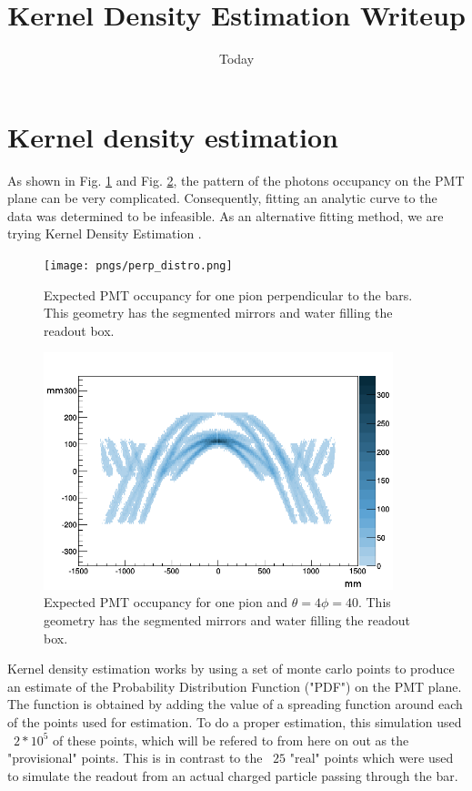 \documentclass[11pt]{article}
\begin{document}
\title{Kernel Density Estimation Writeup}
\date{Today}
\maketitle

\section{Kernel density estimation}
As shown in Fig. \ref{fig:perp_distribution} and Fig. \ref{fig:distribution}, the pattern of the photons occupancy on the PMT plane can be very complicated.  Consequently, fitting an analytic curve to the data was determined to be infeasible.  As an alternative fitting method, we are trying Kernel Density Estimation \cite{rosenblatt1956}.
\begin{figure}
\centering
\texttt{[image: pngs/perp\_distro.png]}
\caption{Expected PMT occupancy for one pion perpendicular to the bars.  This geometry has the segmented mirrors and water filling the readout box.\label{fig:perp_distribution}}
\end{figure}
\begin{figure}
\centering
\includegraphics[width=4in]{pngs/fitdirc_ang440_3seg_index_5000MeV_133_pion_dist.png}
\caption{Expected PMT occupancy for one pion and $\theta=4 \phi=40$.  This geometry has the segmented mirrors and water filling the readout box.\label{fig:distribution}}
\end{figure}
Kernel density estimation works by using a set of monte carlo points to produce an estimate of the Probability Distribution Function ("PDF") on the PMT plane.  The function is obtained by adding the value of a spreading function around each of the points used for estimation.  To do a proper estimation, this simulation used ~$2*10^5$ of these points, which will be refered to from here on out as the "provisional" points.  This is in contrast to the ~$25$ "real" points which were used to simulate the readout from an actual charged particle passing through the bar.
\end{document}
